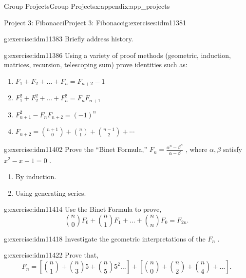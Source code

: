 \documentclass[oneside,10pt,]{book}
\numberwithin{equation}{chapter}
\begin{document}
\begin{appendixptx}{Group Projects}{}{Group Projects}{}{}{x:appendix:app_projects}
%
\begin{exercises-section-numberless}{Project 3: Fibonacci}{}{Project 3: Fibonacci}{}{}{g:exercises:idm11381}
\begin{divisionexercise}{1}{}{}{g:exercise:idm11383}%
Briefly address history.%
\end{divisionexercise}%
\begin{divisionexercise}{2}{}{}{g:exercise:idm11386}%
Using a variety of proof methods (geometric, induction, matrices, recursion, telescoping sum) prove identities such as:%
\begin{enumerate}[label=(\alph*)]
\item{}\(F_{1} + F_{2} + \ldots + F_{n} = F_{n + 2} - 1\)%
\item{}\(F_{1}^{2} + F_{2}^{2} + \ldots + F_{n}^{2} = F_{n}F_{n + 1}\)%
\item{}\(F_{n + 1}^{2} - F_{n}F_{n + 2} = \left( - 1 \right)^{n}\)%
\item{}\(F_{n + 2} = \binom{n + 1}{0} + \binom{n}{1} + \binom{n - 1}{2} + \cdots\)%
\end{enumerate}
%
\end{divisionexercise}%
\begin{divisionexercise}{3}{}{}{g:exercise:idm11402}%
Prove the ``Binet Formula,'' \(F_{n} = \frac{\alpha^{n} - \beta^{n}}{\alpha - \beta}\) , where \(\alpha,\beta\) satisfy \(x^{2} - x - 1 = 0\) .%
\begin{enumerate}[label=(\alph*)]
\item{}By induction.%
\item{}Using generating series.%
\end{enumerate}
%
\end{divisionexercise}%
\begin{divisionexercise}{4}{}{}{g:exercise:idm11414}%
Use the Binet Formula to prove,%
\begin{equation*}
\binom{n}{0}F_{0} + \binom{n}{1} F_{1} + \ldots + \binom{n}{n}F_{0} = F_{2n}.
\end{equation*}
%
\end{divisionexercise}%
\begin{divisionexercise}{5}{}{}{g:exercise:idm11418}%
Investigate the geometric interpretations of the \(F_{n}\) .%
\end{divisionexercise}%
\begin{divisionexercise}{6}{}{}{g:exercise:idm11422}%
Prove that,%
\begin{equation*}
F_{n} = \left\lbrack \binom{n}{1}  + \binom{n}{3} 5 + \binom{n}{5} 5^{2}\ldots \right\rbrack + \left\lbrack \binom{n}{0}  + \binom{n}{2}  + \binom{n}{4}  + \ldots \right\rbrack.

\end{equation*}
\end{divisionexercise}
\end{exercises-section-numberless}
\end{appendixptx}
\end{document}
